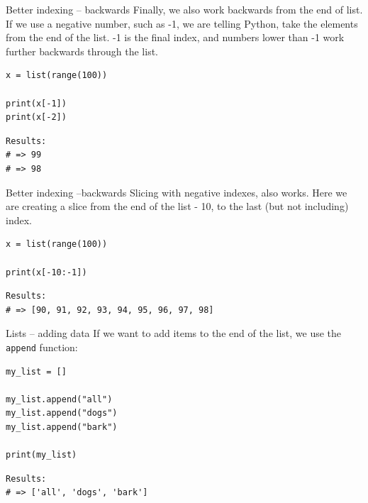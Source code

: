 \documentclass[10pt]{beamer}
\begin{document}
\begin{frame}[label={sec:orgb80bfab},fragile]{Better indexing -- backwards}
 Finally, we also work backwards from the end of list. If we use a negative number,
such as -1, we are telling Python, take the elements from the end of the list. -1 is
the final index, and numbers lower than -1 work further backwards through the list.

\begin{verbatim}
x = list(range(100))

print(x[-1])
print(x[-2])
\end{verbatim}

\begin{verbatim}
Results: 
# => 99
# => 98
\end{verbatim}
\end{frame}

\begin{frame}[label={sec:org6047d24},fragile]{Better indexing --backwards}
 Slicing with negative indexes, also works. Here we are creating a slice from the end
of the list - 10, to the last (but not including) index.

\begin{verbatim}
x = list(range(100))

print(x[-10:-1])
\end{verbatim}

\begin{verbatim}
Results: 
# => [90, 91, 92, 93, 94, 95, 96, 97, 98]
\end{verbatim}
\end{frame}

\begin{frame}[label={sec:org1267459},fragile]{Lists -- adding data}
 If we want to add items to the end of the list, we use the \texttt{append} function:

\begin{verbatim}
my_list = []

my_list.append("all")
my_list.append("dogs")
my_list.append("bark")

print(my_list)
\end{verbatim}

\begin{verbatim}
Results: 
# => ['all', 'dogs', 'bark']
\end{verbatim}
\end{frame}
\end{document}
